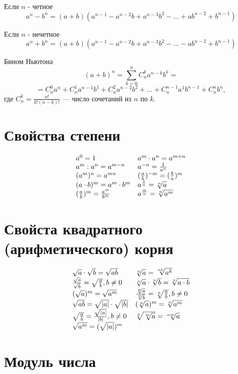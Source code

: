 \documentclass[a4paper, 12pt]{article}
\begin{document}
Если $n$ - четное
$$a^n-b^n=(a+b)(a^{n-1}-a^{n-2}b+a^{n-3}b^2-\dots +ab^{n-2}+b^{n-1})$$

Если $n$ - нечетное
$$a^n+b^n=(a+b)(a^{n-1}-a^{n-2}b+a^{n-3}b^2-\dots -ab^{n-2}+b^{n-1})$$

Бином Ньютона
$$(a+b)^n=\sum\limits_{k=0}^n C_n^ka^{n-k}b^k=$$
$$=C_n^0a^n+C_n^1a^{n-1}b^1+C_n^2a^{n-2}b^2+\dots +C_n^{n-1}a^1b^{n-1}+C_n^nb^n,$$
где $C_n^k=\frac{n!}{k!(n-k)!}$ --- число сочетаний из $n$ по $k.$

\section{Свойства степени}

$$
\begin{array}{ll}
a^0=1  & a^m\cdot a^n=a^{m+n}\\
a^m: a^n=a^{m-n} & a^{-n}=\frac{1}{a^n}\\
(a^m)^n=a^{mn} & (\frac{a}{b})^{-m}=(\frac{b}{a})^{m}\\
(a\cdot b)^m=a^m\cdot b^m & a^{\frac{1}{n}}=\root{n}\of{a}\\
(\frac{a}{b})^m =\frac{a^m}{b^m} & a^{\frac{m}{n}}=\root{n}\of{a^m}\\
\end{array}
$$

\section{Свойста квадратного (арифметического) корня}

$$
\begin{array}{ll}
\sqrt{a}\cdot \sqrt{b} = \sqrt{ab}  & \root{n}\of{a}=\root{nk}\of{a^k} \\
\frac{\sqrt{a}}{\sqrt{b}}=\sqrt{\frac{a}{b}}, b\not= 0 & \root{n}\of{a}\cdot \root{n}\of{b}=\root{n}\of{a\cdot b}\\
(\sqrt{a})^m=\sqrt{a^m} & \frac{\root{n}\of{a}}{\root{n}\of{b}}=\root{n}\of{\frac{a}{b}}, b\not=0\\
\sqrt{ab}=\sqrt{|a|}\cdot \sqrt{|b|} & (\root{n}\of{a})^m = \root{n}\of{a^m}\\
\sqrt{\frac{a}{b}}=\frac{\sqrt{|a|}}{|b|}, b\not=0 & \root{n}\of{\root{m}\of{a}} = \root{nm}\of{a}\\
\sqrt{a^m}=(\sqrt{|a|})^m
\end{array}
$$

\section{Модуль числа}
\end{document}
